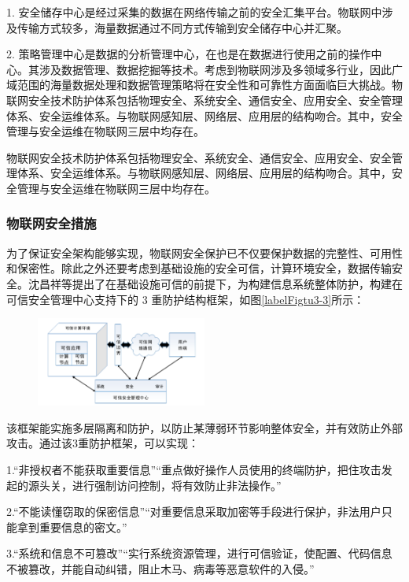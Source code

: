 \documentclass[10.5pt,twocolumn]{jbuaa}
\begin{document}
1. 安全储存中心是经过采集的数据在网络传输之前的安全汇集平台。物联网中涉及传输方式较多，海量数据通过不同方式传输到安全储存中心并汇聚。

2. 策略管理中心是数据的分析管理中心，在也是在数据进行使用之前的操作中心。其涉及数据管理、数据挖掘等技术。考虑到物联网涉及多领域多行业，因此广域范围的海量数据处理和数据管理策略将在安全性和可靠性方面面临巨大挑战。物联网安全技术防护体系包括物理安全、系统安全、通信安全、应用安全、安全管理体系、安全运维体系。与物联网感知层、网络层、应用层的结构吻合。其中，安全管理与安全运维在物联网三层中均存在。

物联网安全技术防护体系包括物理安全、系统安全、通信安全、应用安全、安全管理体系、安全运维体系。与物联网感知层、网络层、应用层的结构吻合。其中，安全管理与安全运维在物联网三层中均存在。

\subsubsection{物联网安全措施}
为了保证安全架构能够实现，物联网安全保护已不仅要保护数据的完整性、可用性和保密性。除此之外还要考虑到基础设施的安全可信，计算环境安全，数据传输安全。沈昌祥等提出了在基础设施可信的前提下，为构建信息系统整体防护，构建在可信安全管理中心支持下的 3 重防护结构框架，如图\ref{labelFigtu3-3}所示：
\begin{figure}[ht]
\centering
\includegraphics [width=0.5\textwidth]{./image/tu3-3.png}
\end{figure}

该框架能实施多层隔离和防护，以防止某薄弱环节影响整体安全，并有效防止外部攻击。通过该3重防护框架，可以实现：

1.“非授权者不能获取重要信息”“重点做好操作人员使用的终端防护，把住攻击发起的源头关，进行强制访问控制，将有效防止非法操作。”

2.“不能读懂窃取的保密信息”“对重要信息采取加密等手段进行保护，非法用户只能拿到重要信息的密文。”

3.“系统和信息不可篡改”“实行系统资源管理，进行可信验证，使配置、代码信息不被篡改，并能自动纠错，阻止木马、病毒等恶意软件的入侵。”
\end{document}
